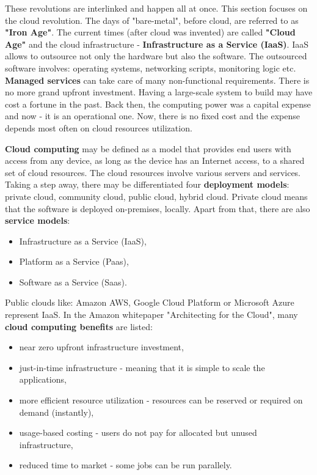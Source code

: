 These revolutions are interlinked and happen all at once. This section focuses on the cloud revolution. The days of "bare-metal", before cloud, are referred to as \textbf{"Iron Age"}\cite{book-iac}\cite{book-cndwk}. The current times (after cloud was invented) are called \textbf{"Cloud Age"} and the cloud infrastructure - \textbf{Infrastructure as a Service (IaaS)}. IaaS allows to outsource not only the hardware but also the software. The outsourced software involves: operating systems, networking scripts, monitoring logic etc. \textbf{Managed services} can take care of many non-functional requirements. There is no more grand upfront investment. Having a large-scale system to build may have cost a fortune in the past. Back then, the computing power was a capital expense and now - it is an operational one. Now, there is no fixed cost and the expense depends most often on cloud resources utilization\cite{book-cndwk}\cite{article-aws-architecting}.

\textbf{Cloud computing} may be defined as a model that provides end users with access from any device, as long as the device has an Internet access, to a shared set of cloud resources. The cloud resources involve various servers and services. Taking a step away, there may be differentiated four \textbf{deployment models}: private cloud, community cloud, public cloud, hybrid cloud. Private cloud means that the software is deployed on-premises, locally. Apart from that, there are also \textbf{service models}\cite{article-poni-cloud}:
\begin{itemize}
\item Infrastructure as a Service (IaaS),
\item Platform as a Service (Paas),
\item Software as a Service (Saas).
\end{itemize}

Public clouds like: Amazon AWS, Google Cloud Platform or Microsoft Azure represent IaaS. In the Amazon whitepaper "Architecting for the Cloud"\cite{article-aws-architecting}, many \textbf{cloud computing benefits} are listed:
\begin{itemize}
\item near zero upfront infrastructure investment,
\item just-in-time infrastructure - meaning that it is simple to scale the applications,
\item more efficient resource utilization - resources can be reserved or required on demand (instantly),
\item usage-based costing - users do not pay for allocated but unused infrastructure,
\item reduced time to market - some jobs can be run parallely.
\end{itemize}

